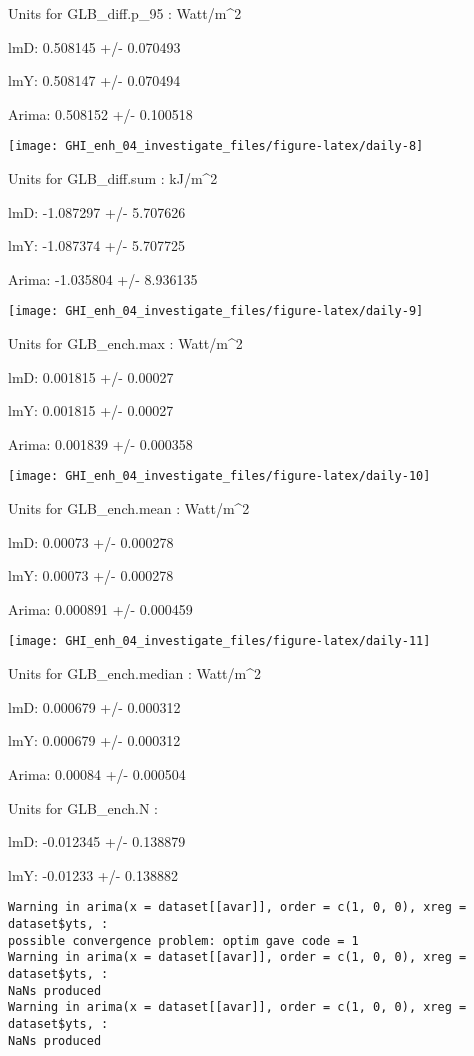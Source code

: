 \documentclass[
  10pt,
  a4paper,oneside]{article}
\begin{document}
Units for GLB\_diff.p\_95 : Watt/m\^{}2

lmD: 0.508145 +/- 0.070493

lmY: 0.508147 +/- 0.070494

Arima: 0.508152 +/- 0.100518

\begin{center}\texttt{[image: GHI\_enh\_04\_investigate\_files/figure-latex/daily-8]} \end{center}

Units for GLB\_diff.sum : kJ/m\^{}2

lmD: -1.087297 +/- 5.707626

lmY: -1.087374 +/- 5.707725

Arima: -1.035804 +/- 8.936135

\begin{center}\texttt{[image: GHI\_enh\_04\_investigate\_files/figure-latex/daily-9]} \end{center}

Units for GLB\_ench.max : Watt/m\^{}2

lmD: 0.001815 +/- 0.00027

lmY: 0.001815 +/- 0.00027

Arima: 0.001839 +/- 0.000358

\begin{center}\texttt{[image: GHI\_enh\_04\_investigate\_files/figure-latex/daily-10]} \end{center}

Units for GLB\_ench.mean : Watt/m\^{}2

lmD: 0.00073 +/- 0.000278

lmY: 0.00073 +/- 0.000278

Arima: 0.000891 +/- 0.000459

\begin{center}\texttt{[image: GHI\_enh\_04\_investigate\_files/figure-latex/daily-11]} \end{center}

Units for GLB\_ench.median : Watt/m\^{}2

lmD: 0.000679 +/- 0.000312

lmY: 0.000679 +/- 0.000312

Arima: 0.00084 +/- 0.000504

Units for GLB\_ench.N :

lmD: -0.012345 +/- 0.138879

lmY: -0.01233 +/- 0.138882

\begin{verbatim}
Warning in arima(x = dataset[[avar]], order = c(1, 0, 0), xreg = dataset$yts, :
possible convergence problem: optim gave code = 1
Warning in arima(x = dataset[[avar]], order = c(1, 0, 0), xreg = dataset$yts, :
NaNs produced
Warning in arima(x = dataset[[avar]], order = c(1, 0, 0), xreg = dataset$yts, :
NaNs produced
\end{verbatim}
\end{document}
